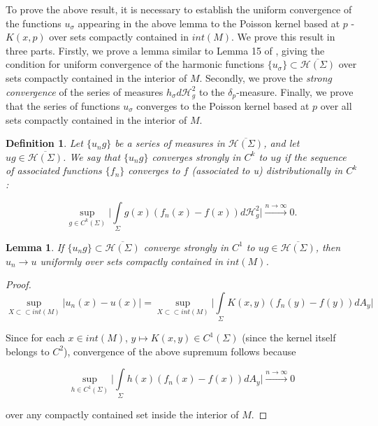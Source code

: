\documentclass{amsart}
\newcommand{\hm}{\mathscr{H}}
\newtheorem{lemma}{Lemma}
\newtheorem{definition}{Definition}
\theoremstyle{named}
\begin{document}
To prove the above result, it is necessary to establish the uniform convergence of the functions $u_{\sigma}$ appearing in the above lemma to the Poisson kernel based at $p$ - $K(x,p)$ over sets compactly contained in $int(M)$. We prove this result in three parts. Firstly, we prove a lemma similar to Lemma 15 of \cite{jeff}, giving the condition for uniform convergence of the harmonic functions $\{u_{\sigma}\} \subset \overline{\mathcal{H}(\Sigma)}$ over sets compactly contained in the interior of $M$. Secondly, we prove the \textit{strong convergence} of the series of measures $h_{\sigma} d\hm^2_g$ to the $\delta_p$-measure. Finally, we prove that the series of functions $u_{\sigma}$ converges to the Poisson kernel based at $p$ over all sets compactly contained in the interior of $M$.

\begin{definition}
    Let $\{ u_n g \}$ be a series of measures in $\overline{\mathcal{H}(\Sigma)}$, and let $u g \in \overline{\mathcal{H}(\Sigma)}$. We say that $\{ u_n g \}$ \textit{converges strongly in $C^{k}$} to $ug$ if the sequence of associated functions $\{ f_n \}$ converges to $f$ (associated to u) distributionally in $C^k$:

    \begin{equation} \nonumber 
        \sup\limits_{g \in C^k(\Sigma)} \bigg| \int\limits_{\Sigma} g(x) (f_{n}(x) - f(x)) d\hm^2_g \bigg| \xrightarrow{n \rightarrow \infty} 0.
    \end{equation}
    
\end{definition}

\begin{lemma} \label{lemma: strong convergence of u}
    If $\{ u_n g \} \subset \overline{\mathcal{H}(\Sigma)}$ converge strongly in $C^1$ to $ug \in \overline{\mathcal{H}(\Sigma)}$, then $u_n \rightarrow u$ uniformly over sets compactly contained in $int (M)$.
\end{lemma}

\begin{proof}

    \begin{equation*}
        \sup\limits_{X \subset \subset int(M)} \Big| u_n(x) - u(x) \Big| = \sup\limits_{X \subset\subset int(M)} \bigg| \int\limits_{\Sigma} K(x,y) (f_{n}(y) - f(y)) dA_{y} \bigg|
    \end{equation*}

    Since for each $x \in int(M)$, $y \mapsto K(x,y) \in C^1(\Sigma)$ (since the kernel itself belongs to $C^2$), convergence of the above supremum follows because

    \begin{equation*}
        \sup\limits_{h \in C^1(\Sigma)} \bigg| \int\limits_{\Sigma} h(x) (f_n(x) - f(x)) dA_y \bigg| \xrightarrow{n \rightarrow \infty} 0
    \end{equation*}

    over any compactly contained set inside the interior of $M$.
    
\end{proof}
\end{document}
